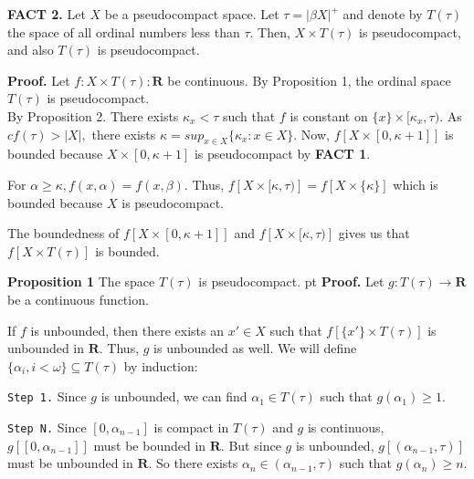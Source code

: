\documentclass{article}
\begin{document}
\textbf{FACT 2.} Let $X$ be a pseudocompact space. Let $\tau=|\beta X|^+$ and denote by $T(\tau)$ the space of all ordinal numbers less than $\tau$.  Then,  $X\times T(\tau)$ is pseudocompact, and also $T(\tau)$ is pseudocompact. \\
\vskip 15pt


\textbf{Proof.} Let $f: X\times T(\tau): \textbf{R}$ be continuous. \vskip 10pt
By Proposition 1, the ordinal space $T(\tau)$ is pseudocompact.\\ 

By Proposition 2. There exists $\kappa_x<\tau$ such that $f$ is constant on $\{x\}\times [\kappa_x, \tau)$. 
As $cf(\tau)>|X|,$ there exists $\kappa=sup_{x\in X} \{\kappa_x: x\in X\}.$ 
Now, $f\left[X\times [0,\kappa+1]\right]$ is bounded because $X\times [0,\kappa+1]$ is pseudocompact by \textbf{FACT 1}.\vskip 5pt

For $\alpha\geq \kappa, f(x,\alpha)=f(x,\beta).$ Thus, $f\left[X\times [\kappa,\tau)\right]=f\left[X\times\{\kappa\}\right]$ which is bounded because $X$ is pseudocompact. \vskip 5pt



The boundedness of $f\left[X\times [0,\kappa+1]\right]$ and $f\left[X\times [\kappa,\tau)\right]$ gives us that $f\left[X\times T(\tau)\right]$ is bounded. 



\vskip 20pt










\textbf{Proposition 1} The space $T(\tau)$ is pseudocompact.
 pt
\textbf{Proof.} Let $g: T(\tau) \rightarrow \textbf{R}$ be a continuous function.


If $f$ is unbounded, then there 
exists an $x'\in X$ such that $f\left[\{x'\} \times T(\tau)\right]$ is unbounded in $\textbf{R}$.
 Thus, $g$ is unbounded as well. 
We will define $\{\alpha_i, i<\omega\}\subseteq T(\tau)$ by induction: \vskip 5pt

\texttt{Step 1.}
Since $g$ is unbounded, we can find $\alpha_1\in T(\tau)$ such that $g(\alpha_1)\geq1$. 

\vskip 5pt

\texttt{Step N.}
Since $[0,\alpha_{n-1}]$ is compact in $T(\tau)$ and $g$ is continuous, $g\left[[0,\alpha_{n-1}]\right]$ must be bounded in $\textbf{R}.$ 
But since $g$ is unbounded,  $g\left[(\alpha_{n-1}, \tau)\right]$ must be unbounded in $\textbf{R}$. So there exists $\alpha_n\in (\alpha_{n-1}, \tau)$
such that $g(\alpha_n) \geq n$. 
\end{document}
